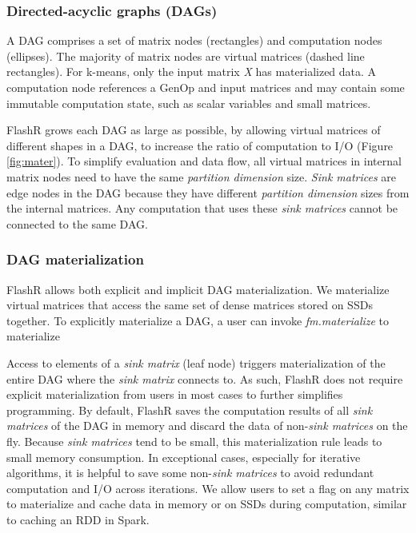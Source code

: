 \subsubsection{Directed-acyclic graphs (DAGs)}
A DAG comprises a set of matrix nodes (rectangles) and computation nodes
(ellipses). The majority of matrix nodes are virtual matrices (dashed line rectangles).
For k-means, only the input matrix \textit{X} has materialized data.
A computation node references a GenOp and input matrices and
may contain some immutable computation state, such as scalar variables and
small matrices. 

FlashR grows each DAG as large as possible, by allowing virtual matrices
of different shapes in a DAG, to increase the ratio of computation to I/O
(Figure \ref{fig:mater}). To simplify evaluation and data flow, 
all virtual matrices in internal matrix nodes need to have the same
\textit{partition dimension} size. \textit{Sink matrices} are edge nodes
in the DAG because they have different \textit{partition dimension} sizes
from the internal matrices. Any computation that uses these
\textit{sink matrices} cannot be connected to the same DAG.  

\subsubsection{DAG materialization}
FlashR allows both explicit and implicit DAG materialization.
We materialize virtual matrices that access the same set of dense matrices
stored on SSDs together. To explicitly
materialize a DAG, a user can invoke \textit{fm.materialize} to materialize

Access to elements of a \textit{sink matrix} (leaf node) triggers materialization
of the entire DAG where the \textit{sink matrix} connects to. As such,
FlashR does not require explicit materialization from users in most cases
to further simplifies programming. By default,
FlashR saves the computation results of all \textit{sink matrices} of
the DAG in memory and discard the data of non-\textit{sink matrices} on the fly.
Because \textit{sink matrices} tend to be small, this materialization
rule leads to small memory consumption.
In exceptional cases, especially for iterative algorithms,
it is helpful to save some non-\textit{sink matrices} to avoid
redundant computation and I/O across iterations.  We allow users to
set a flag on any matrix to materialize and cache data in memory
or on SSDs during computation, similar to caching an RDD in Spark.

